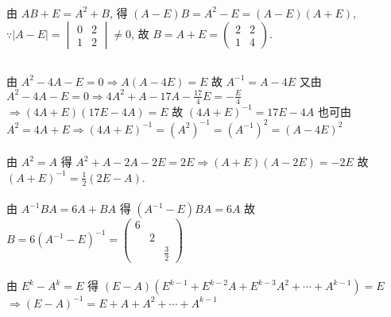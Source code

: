 	 \paragraph{} %
		 由 $AB + E = A^2 + B$, 得 $(A - E)B = A^2 - E = (A - E)(A + E)$,
		 $\because |A - E| = \begin{vmatrix}
				 0 & 2 \\
				 1 & 2
			 \end{vmatrix} \neq 0$, 故 $B = A + E = \begin{pmatrix}
				 2 & 2 \\
				 1 & 4
			 \end{pmatrix}$.


 \subsection{} %


	 \paragraph{} %
		 由 $A^2-4A-E=0 \Rightarrow A(A-4E)=E$
		 故 $A^{-1}=A-4E$
		 又由 $A^2-4A-E=0 \Rightarrow 4A^2+A-17A-\frac{17}{4}E=-\frac{E}{4}$
		 $\Rightarrow (4A+E)(17E-4A)=E$
		 故 $(4A+E)^{-1}=17E-4A$
		 也可由 $A^2=4A+E \Rightarrow (4A+E)^{-1}=(A^2)^{-1}=(A^{-1})^2=(A-4E)^2$


	 \paragraph{} %
		 由 $A^2=A$ 得 $A^2+A-2A-2E=2E \Rightarrow (A+E)(A-2E)=-2E$
		 故 $(A+E)^{-1}=\frac{1}{2}(2E-A)$.


	 \paragraph{} %
		 由 $A^{-1}BA=6A+BA$ 得 $(A^{-1}-E)BA=6A$
		 故 $B=6(A^{-1}-E)^{-1} = \begin{pmatrix}
				 6 &   &             \\
				   & 2 &             \\
				   &   & \frac{3}{2}
			 \end{pmatrix}$


	 \paragraph{} %
		 由 $E^k-A^k=E$
		 得 $(E-A)(E^{k-1}+E^{k-2}A+E^{k-3}A^2+\cdots+A^{k-1})=E$
		 $\Rightarrow (E-A)^{-1}=E+A+A^2+\cdots+A^{k-1}$


